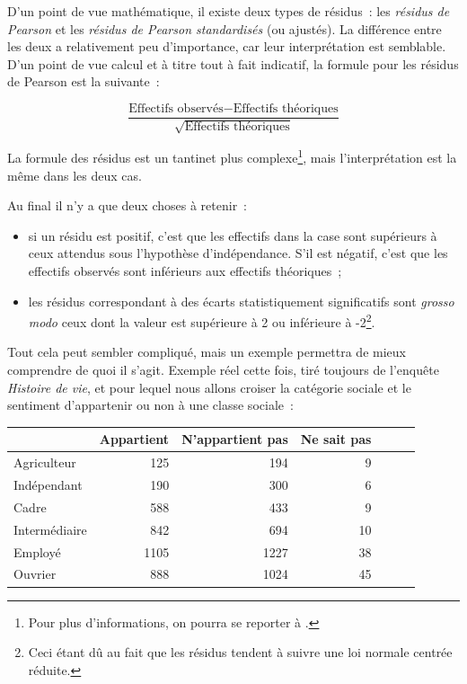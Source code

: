 \documentclass[a4paper,10pt,twoside,francais]{report}
\renewcommand{\cite}{\citep}
\begin{document}
D'un point de vue mathématique, il existe deux types de résidus~: les
\textit{résidus de Pearson} et les \textit{résidus de Pearson
  standardisés} (ou ajustés). La différence entre les deux a
relativement peu d'importance, car leur interprétation est semblable. D'un
point de vue calcul et à titre tout à fait indicatif, la formule pour
les résidus de Pearson est la suivante~:

$$\frac{\text{Effectifs observés} - \text{Effectifs
    théoriques}}{\sqrt{\text{Effectifs théoriques}}}$$

La formule des résidus est un tantinet plus complexe\footnote{Pour
  plus d'informations, on pourra se reporter à
  \cite[p.\,81]{Agresti2002}.}, mais l'interprétation est la même dans
les deux cas.

Au final il n'y a que deux choses à retenir~:

\begin{itemize}
\item si un résidu est positif, c'est que les effectifs dans la case
  sont supérieurs à ceux attendus sous l'hypothèse
  d'indépendance. S'il est négatif, c'est que les effectifs observés
  sont inférieurs aux effectifs théoriques~;
\item les résidus correspondant à des écarts statistiquement
  significatifs sont \textit{grosso modo} ceux dont la valeur est
  supérieure à 2 ou inférieure à -2\footnote{Ceci étant dû au fait que
    les résidus tendent à suivre une loi normale centrée réduite.}.
\end{itemize}

Tout cela peut sembler compliqué, mais un exemple permettra de mieux
comprendre de quoi il s'agit. Exemple réel cette fois, tiré toujours
de l'enquête \textit{Histoire de vie}, et pour lequel nous allons
croiser la catégorie sociale et le sentiment d'appartenir ou non à une
classe sociale~:

\begin{table}[H]
  \begin{center}
    \begin{tabular}[!h]{lrrrrrr}
      \toprule
      & Appartient & N'appartient pas & Ne sait pas \\
      \midrule
      Agriculteur & 125 & 194 & 9 \\
      Indépendant & 190 & 300 & 6 \\
      Cadre & 588 & 433 & 9 \\
      Intermédiaire & 842 & 694 & 10 \\
      Employé & 1105 & 1227 & 38 \\
      Ouvrier & 888 & 1024 & 45 \\
      \bottomrule
    \end{tabular}
  \end{center}
\end{table}
\end{document}

